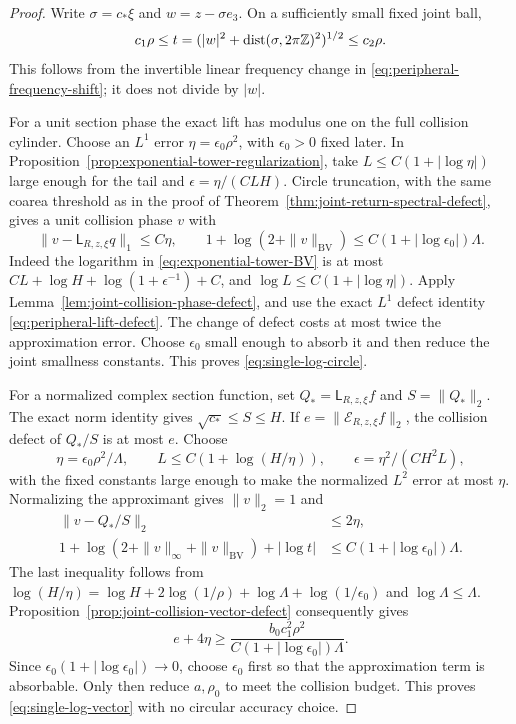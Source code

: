 \begin{proof}
Write $\sigma=c_*\xi$ and $w=z-\sigma e_3$. On a sufficiently small
fixed joint ball,
\[
 c_1\rho\le t=(|w|^2+\operatorname{dist}(\sigma,2\pi\mathbb Z)^2)^{1/2}
                         \le c_2\rho.
\]
This follows from the invertible linear frequency change in
\eqref{eq:peripheral-frequency-shift}; it does not divide by $|w|$.

For a unit section phase the exact lift has modulus one on the full
collision cylinder. Choose an $L^1$ error $\eta=\epsilon_0\rho^2$,
with $\epsilon_0>0$ fixed later. In
Proposition~\ref{prop:exponential-tower-regularization}, take
$L\le C(1+|\log\eta|)$ large enough for the tail and
$\epsilon=\eta/(CLH)$. Circle truncation, with the same coarea threshold
as in the proof of Theorem~\ref{thm:joint-return-spectral-defect},
gives a unit collision phase $v$ with
\[
 \|v-\mathsf L_{R,z,\xi}q\|_1\le C\eta,\qquad
 1+\log(2+\|v\|_{\mathrm{BV}})
               \le C(1+|\log\epsilon_0|)\Lambda.
\]
Indeed the logarithm in \eqref{eq:exponential-tower-BV} is at most
$CL+\log H+\log(1+\epsilon^{-1})+C$, and
$\log L\le C(1+|\log\eta|)$. Apply
Lemma~\ref{lem:joint-collision-phase-defect}, and use the exact
$L^1$ defect identity \eqref{eq:peripheral-lift-defect}. The change of
defect costs at most twice the approximation error. Choose
$\epsilon_0$ small enough to absorb it and then reduce the joint
smallness constants. This proves \eqref{eq:single-log-circle}.

For a normalized complex section function, set
$Q_*=\mathsf L_{R,z,\xi}f$ and $S=\|Q_*\|_2$. The exact norm
identity gives $\sqrt{c_*}\le S\le H$. If
$e=\|\mathcal E_{R,z,\xi}f\|_2$, the collision defect of $Q_*/S$
is at most $e$. Choose
\[
 \eta=\epsilon_0\rho^2/\Lambda,\qquad
 L\le C(1+\log(H/\eta)),\qquad
 \epsilon=\eta^2/(CH^2L),
\]
with the fixed constants large enough to make the normalized $L^2$
error at most $\eta$. Normalizing the approximant gives $\|v\|_2=1$
and
\begin{align*}
 \|v-Q_*/S\|_2&\le2\eta,\\
 1+\log(2+\|v\|_\infty+\|v\|_{\mathrm{BV}})+|\log t|
       &\le C(1+|\log\epsilon_0|)\Lambda.
\end{align*}
The last inequality follows from
$\log(H/\eta)=\log H+2\log(1/\rho)+\log\Lambda+
\log(1/\epsilon_0)$ and $\log\Lambda\le\Lambda$.
Proposition~\ref{prop:joint-collision-vector-defect} consequently gives
\[
 e+4\eta\ge\frac{b_0c_1^2\rho^2}
                         {C(1+|\log\epsilon_0|)\Lambda}.
\]
Since $\epsilon_0(1+|\log\epsilon_0|)\to0$, choose $\epsilon_0$
first so that the approximation term is absorbable. Only then reduce
$a,\rho_0$ to meet the collision budget. This proves
\eqref{eq:single-log-vector} with no circular accuracy choice.
\end{proof}


